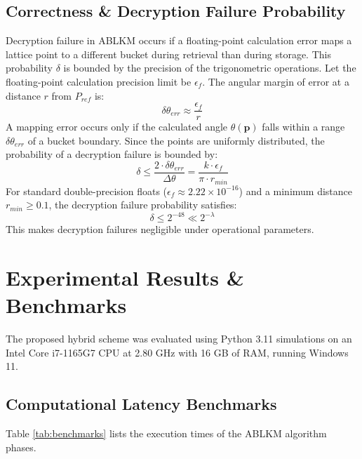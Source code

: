 \documentclass[conference,a4paper]{IEEEtran}
\begin{document}
\subsection{Correctness \& Decryption Failure Probability}
Decryption failure in ABLKM occurs if a floating-point calculation error maps a lattice point to a different bucket during retrieval than during storage. This probability $\delta$ is bounded by the precision of the trigonometric operations. Let the floating-point calculation precision limit be $\epsilon_f$. The angular margin of error at a distance $r$ from $P_{ref}$ is:
\begin{equation}
\delta\theta_{err} \approx \frac{\epsilon_f}{r}
\end{equation}
A mapping error occurs only if the calculated angle $\theta(\mathbf{p})$ falls within a range $\delta\theta_{err}$ of a bucket boundary. Since the points are uniformly distributed, the probability of a decryption failure is bounded by:
\begin{equation}
\delta \le \frac{2 \cdot \delta\theta_{err}}{\Delta\theta} = \frac{k \cdot \epsilon_f}{\pi \cdot r_{min}}
\end{equation}
For standard double-precision floats ($\epsilon_f \approx 2.22 \times 10^{-16}$) and a minimum distance $r_{min} \ge 0.1$, the decryption failure probability satisfies:
\begin{equation}
\delta \le 2^{-48} \ll 2^{-\lambda}
\end{equation}
This makes decryption failures negligible under operational parameters.

\section{Experimental Results \& Benchmarks}
The proposed hybrid scheme was evaluated using Python 3.11 simulations on an Intel Core i7-1165G7 CPU at 2.80 GHz with 16 GB of RAM, running Windows 11.

\subsection{Computational Latency Benchmarks}
Table \ref{tab:benchmarks} lists the execution times of the ABLKM algorithm phases.
\end{document}
